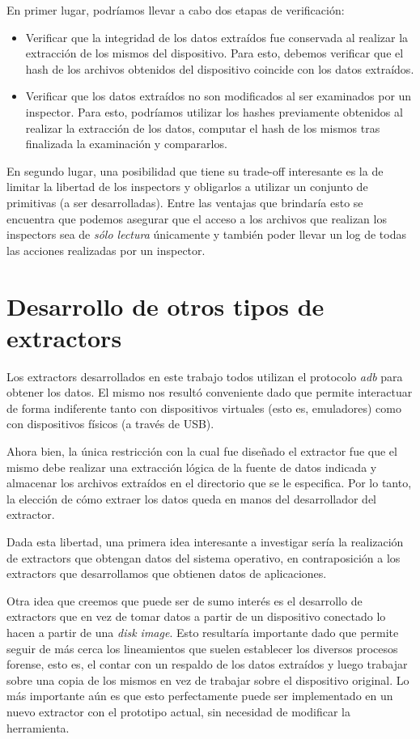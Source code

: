 En primer lugar, podríamos llevar a cabo dos etapas de verificación:
\begin{itemize}
\item Verificar que la integridad de los datos extraídos fue conservada al realizar la extracción de los mismos del dispositivo. Para esto, debemos verificar que el hash de los archivos obtenidos del dispositivo coincide con los datos extraídos.
\item Verificar que los datos extraídos no son modificados al ser examinados por un inspector. Para esto, podríamos utilizar los hashes previamente obtenidos al realizar la extracción de los datos, computar el hash de los mismos tras finalizada la examinación y compararlos.
\end{itemize}

En segundo lugar, una posibilidad que tiene su trade-off interesante es la de limitar la libertad de los inspectors y obligarlos a utilizar un conjunto de primitivas (a ser desarrolladas). Entre las ventajas que brindaría esto se encuentra que podemos asegurar que el acceso a los archivos que realizan los inspectors sea de \emph{sólo lectura} únicamente y también poder llevar un log de todas las acciones realizadas por un inspector.

\section{Desarrollo de otros tipos de extractors}
Los extractors desarrollados en este trabajo todos utilizan el protocolo \emph{adb} para obtener los datos. El mismo nos resultó conveniente dado que permite interactuar de forma indiferente tanto con dispositivos virtuales (esto es, emuladores) como con dispositivos físicos (a través de USB).

Ahora bien, la única restricción con la cual fue diseñado el extractor fue que el mismo debe realizar una extracción lógica de la fuente de datos indicada y almacenar los archivos extraídos en el directorio que se le especifica. Por lo tanto, la elección de cómo extraer los datos queda en manos del desarrollador del extractor.

Dada esta libertad, una primera idea interesante a investigar sería la realización de extractors que obtengan datos del sistema operativo, en contraposición a los extractors que desarrollamos que obtienen datos de aplicaciones.

Otra idea que creemos que puede ser de sumo interés es el desarrollo de extractors que en vez de tomar datos a partir de un dispositivo conectado lo hacen a partir de una \emph{disk image}. Esto resultaría importante dado que permite seguir de más cerca los lineamientos que suelen establecer los diversos procesos forense, esto es, el contar con un respaldo de los datos extraídos y luego trabajar sobre una copia de los mismos en vez de trabajar sobre el dispositivo original. Lo más importante aún es que esto perfectamente puede ser implementado en un nuevo extractor con el prototipo actual, sin necesidad de modificar la herramienta.

